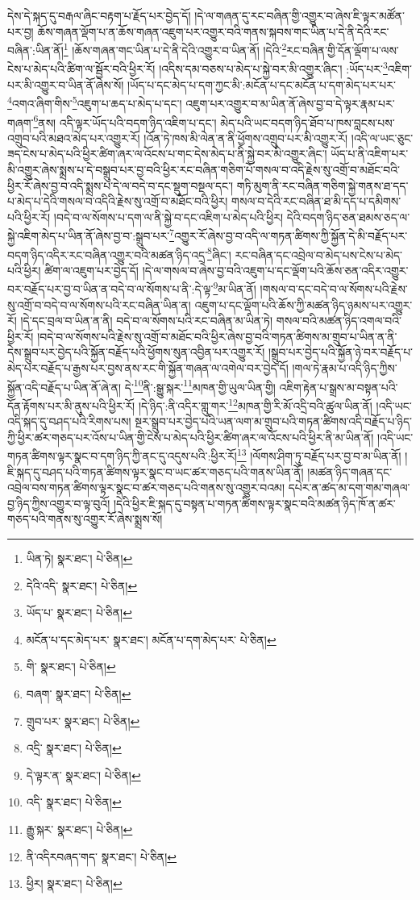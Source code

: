 དེས་དེ་སྐད་དུ་བརྒལ་ཞིང་བརྟག་པ་རྗོད་པར་བྱེད་དོ། །དེ་ལ་གཞན་དུ་རང་བཞིན་གྱི་འགྱུར་བ་ཞེས་ཇི་ལྟར་མཚོན་པར་བྱ། ཆོས་གཞན་ལྡོག་པ་ན་ཆོས་གཞན་འཇུག་པར་འགྱུར་བའི་གནས་སྐབས་གང་ཡིན་པ་དེ་ནི་དེའི་རང་བཞིན་:ཡིན་ནོ།\footnote{ཡིན་ཏེ།  སྣར་ཐང་།  པེ་ཅིན། } །ཆོས་གཞན་གང་ཡིན་པ་དེ་ནི་དེའི་འགྱུར་བ་ཡིན་ནོ། །དེའི་\footnote{དེའི་འདི་  སྣར་ཐང་།  པེ་ཅིན། }རང་བཞིན་གྱི་དོན་ལྡོག་པ་ལས་ངེས་པ་མེད་པའི་ཚིག་ལ་སྦྱོར་བའི་ཕྱིར་རོ། །འདིས་དམ་བཅས་པ་མེད་པ་སྐྱེ་བར་མི་འགྱུར་ཞིང་། :ཡོད་པར་\footnote{ཡོད་པ་  སྣར་ཐང་།  པེ་ཅིན། }འཇིག་པར་མི་འགྱུར་བ་ཡིན་ནོ་ཞེས་སོ། །ཡོད་པ་དང་མེད་པ་དག་ཀྱང་མི་:མངོན་པ་དང་མངོན་པ་དག་མེད་པར་པར་\footnote{མངོན་པ་དང་མེད་པར་  སྣར་ཐང་། མངོན་པ་དག་མེད་པར་  པེ་ཅིན། }འགའ་ཞིག་གིས་\footnote{གི་  སྣར་ཐང་།  པེ་ཅིན། }འཇུག་པ་ཆད་པ་མེད་པ་དང་། འཇུག་པར་འགྱུར་བ་མ་ཡིན་ནོ་ཞེས་བྱ་བ་དེ་ལྟར་རྣམ་པར་གཞག་\footnote{བཞག་  སྣར་ཐང་།  པེ་ཅིན། }ནས། འདི་ལྟར་ཡོད་པའི་བདག་ཉིད་འཇིག་པ་དང་། མེད་པའི་ཡང་བདག་ཉིད་ཐོབ་པ་ཁས་བླངས་པས་འགྲུབ་པའི་མཐའ་མེད་པར་འགྱུར་རོ། །འོན་ཏེ་ཁས་མི་ལེན་ན་ནི་ཕྱོགས་འགྲུབ་པར་མི་འགྱུར་རོ། །འདི་ལ་ཡང་ཅུང་ཟད་ངེས་པ་མེད་པའི་ཕྱིར་ཚིག་ཞར་ལ་འོངས་པ་གང་དེས་མེད་པ་ནི་སྐྱེ་བར་མི་འགྱུར་ཞིང་། ཡོད་པ་ནི་འཇིག་པར་མི་འགྱུར་ཞེས་སྨྲས་པ་དེ་བསྒྲུབ་པར་བྱ་བའི་ཕྱིར་རང་བཞིན་གཅིག་པོ་གསལ་བ་འདི་རྗེས་སུ་འགྲོ་བ་མཐོང་བའི་ཕྱིར་རོ་ཞེས་བྱ་བ་འདི་སྨྲས་པ་དེ་ལ་བདེ་བ་དང་སྡུག་བསྔལ་དང་། གཏི་མུག་ནི་རང་བཞིན་གཅིག་སྐྱེ་གནས་ཐ་དད་པ་མེད་པ་དེའི་གསལ་བ་འདིའི་རྗེས་སུ་འགྲོ་བ་མཐོང་བའི་ཕྱིར། གསལ་བ་དེའི་རང་བཞིན་ཐ་མི་དད་པ་དམིགས་པའི་ཕྱིར་རོ། །བདེ་བ་ལ་སོགས་པ་དག་ལ་ནི་སྐྱེ་བ་དང་འཇིག་པ་མེད་པའི་ཕྱིར། དེའི་བདག་ཉིད་ཅན་ཐམས་ཅད་ལ་སྐྱེ་འཇིག་མེད་པ་ཡིན་ནོ་ཞེས་བྱ་བ་:སྒྲུབ་པར་\footnote{གྲུབ་པར་  སྣར་ཐང་།  པེ་ཅིན། }འགྱུར་རོ་ཞེས་བྱ་བ་འདི་ལ་གཏན་ཚིགས་ཀྱི་སྐྱོན་དེ་མི་བརྗོད་པར་བདག་ཉིད་འདིར་རང་བཞིན་འགྱུར་བའི་མཚན་ཉིད་འདྲ་\footnote{འདྲི་  སྣར་ཐང་།  པེ་ཅིན། }ཞིང་། རང་བཞིན་དང་འབྲེལ་བ་མེད་པས་ངེས་པ་མེད་པའི་ཕྱིར། ཚིག་ལ་འཇུག་པར་བྱེད་དོ། །དེ་ལ་གསལ་བ་ཞེས་བྱ་བའི་འཇུག་པ་དང་ལྡོག་པའི་ཆོས་ཅན་འདིར་འགྱུར་བར་བརྗོད་པར་བྱ་བ་ཡིན་ན་བདེ་བ་ལ་སོགས་པ་ནི་:དེ་ལྟ་\footnote{དེ་ལྟར་ན་  སྣར་ཐང་།  པེ་ཅིན། }མ་ཡིན་ནོ། །གསལ་བ་དང་བདེ་བ་ལ་སོགས་པའི་རྗེས་སུ་འགྲོ་བ་བདེ་བ་ལ་སོགས་པའི་རང་བཞིན་ཡིན་ན། འཇུག་པ་དང་ལྡོག་པའི་ཆོས་ཀྱི་མཚན་ཉིད་ཉམས་པར་འགྱུར་རོ། །དེ་དང་བྲལ་བ་ཡིན་ན་ནི། བདེ་བ་ལ་སོགས་པའི་རང་བཞིན་མ་ཡིན་ཏེ། གསལ་བའི་མཚན་ཉིད་འགལ་བའི་ཕྱིར་རོ། །བདེ་བ་ལ་སོགས་པའི་རྗེས་སུ་འགྲོ་བ་མཐོང་བའི་ཕྱིར་ཞེས་བྱ་བའི་གཏན་ཚིགས་མ་གྲུབ་པ་ཡིན་ན་ནི་དེས་སྒྲུབ་པར་བྱེད་པའི་སྐྱོན་བརྗོད་པའི་ཕྱོགས་སུན་འབྱིན་པར་འགྱུར་རོ། །སྒྲུབ་པར་བྱེད་པའི་སྐྱོན་ཉེ་བར་བརྗོད་པ་མེད་པར་བརྗོད་པ་རྒྱས་པར་བྱས་ནས་རང་གི་སྐྱོན་གཞན་ལ་འགེལ་བར་བྱེད་དོ། །གལ་ཏེ་རྣམ་པ་འདི་ཉིད་ཀྱིས་སྐྱོན་འདི་བརྗོད་པ་ཡིན་ནོ་ཞེ་ན། དེ་\footnote{འདི་  སྣར་ཐང་།  པེ་ཅིན། }ནི་:སྒྱུ་སྐར་\footnote{རྒྱུ་སྐར་  སྣར་ཐང་།  པེ་ཅིན། }མཁན་གྱི་ཡུལ་ཡིན་གྱི། འཇིག་རྟེན་པ་སྒྲས་མ་བསྟན་པའི་དོན་རྟོགས་པར་མི་ནུས་པའི་ཕྱིར་རོ། །དེ་ཉིད་:ནི་འདིར་གླུ་གར་\footnote{ནི་འདིརབཞད་གད་  སྣར་ཐང་།  པེ་ཅིན། }མཁན་གྱི་རི་མོ་འདྲི་བའི་ཚུལ་ཡིན་ནོ། །འདི་ཡང་འདི་སྐད་དུ་བཤད་པའི་རིགས་པས། སྔར་སྒྲུབ་པར་བྱེད་པའི་ཡན་ལག་མ་གྲུབ་པའི་གཏན་ཚིགས་འདི་བརྗོད་པ་ཉིད་ཀྱི་ཕྱིར་ཚར་གཅད་པར་འོས་པ་ཡིན་གྱི་ངེས་པ་མེད་པའི་ཕྱིར་ཚིག་ཞར་ལ་འོངས་པའི་ཕྱིར་ནི་མ་ཡིན་ནོ། །འདི་ཡང་གཏན་ཚིགས་ལྟར་སྣང་བ་དག་ཉིད་ཀྱི་ནང་དུ་འདུས་པའི་:ཕྱིར་རོ།\footnote{ཕྱིར།  སྣར་ཐང་།  པེ་ཅིན། } །ལོགས་ཤིག་ཏུ་བརྗོད་པར་བྱ་བ་མ་ཡིན་ནོ། །ཇི་སྐད་དུ་བཤད་པའི་གཏན་ཚིགས་ལྟར་སྣང་བ་ཡང་ཚར་གཅད་པའི་གནས་ཡིན་ནོ། །མཚན་ཉིད་གཞན་དང་འབྲེལ་བས་གཏན་ཚིགས་ལྟར་སྣང་བ་ཚར་གཅད་པའི་གནས་སུ་འགྱུར་བའམ། དཔེར་ན་ཚད་མ་དག་གམ་གཞལ་བྱ་ཉིད་ཀྱིས་འགྱུར་བ་ལྟ་བུའོ། །དེའི་ཕྱིར་ཇི་སྐད་དུ་བསྟན་པ་གཏན་ཚིགས་ལྟར་སྣང་བའི་མཚན་ཉིད་ཁོ་ན་ཚར་གཅད་པའི་གནས་སུ་འགྱུར་རོ་ཞེས་སྨྲས་སོ། 